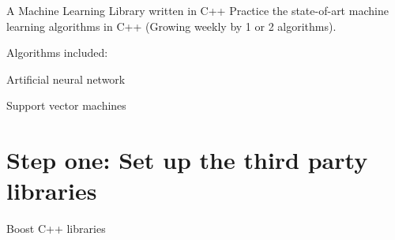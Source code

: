 A Machine Learning Library written in C++ Practice the state-\/of-\/art machine learning algorithms in C++ (Growing weekly by 1 or 2 algorithms).

Algorithms included\-:
\begin{DoxyItemize}
\item Artificial neural network
\item Support vector machines
\end{DoxyItemize}

\section*{Step one\-: Set up the third party libraries}


\begin{DoxyItemize}
\item Boost C++ libraries 
\end{DoxyItemize}